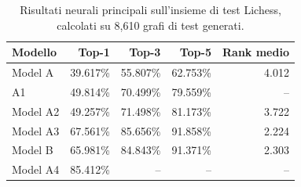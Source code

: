 \begin{table}[H]
\centering
\small
\caption{Risultati neurali principali sull'insieme di test Lichess, calcolati su 8,610 grafi di test generati.}
\label{tab:lichess-results}
\begin{tabular}{lrrrr}
\toprule
Modello & Top-1 & Top-3 & Top-5 & Rank medio \\
\midrule
Model A & 39.617\% & 55.807\% & 62.753\% & 4.012 \\
A1 & 49.814\% & 70.499\% & 79.559\% & -- \\
Model A2 & 49.257\% & 71.498\% & 81.173\% & 3.722 \\
Model A3 & 67.561\% & 85.656\% & 91.858\% & 2.224 \\
Model B & 65.981\% & 84.843\% & 91.371\% & 2.303 \\
Model A4 & 85.412\% & -- & -- & -- \\
\bottomrule
\end{tabular}
\end{table}
